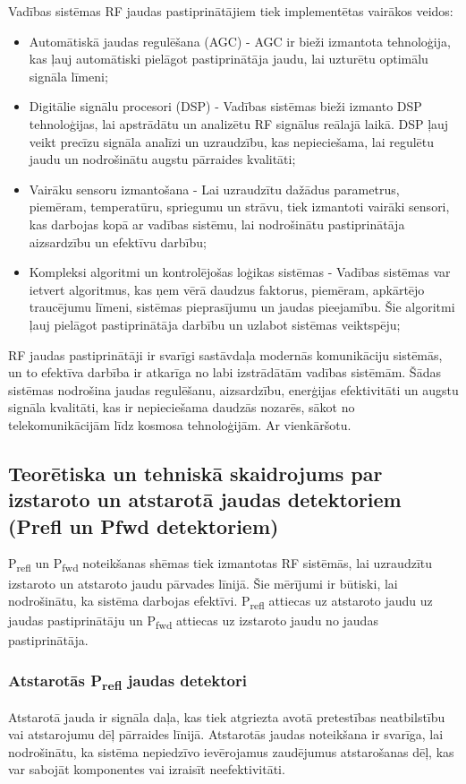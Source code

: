 Vadības sistēmas RF jaudas pastiprinātājiem tiek implementētas vairākos veidos:
\begin{itemize}
    \item Automātiskā jaudas regulēšana (AGC) - AGC ir bieži izmantota tehnoloģija, kas ļauj automātiski pielāgot pastiprinātāja jaudu, lai uzturētu optimālu signāla līmeni;
    \item Digitālie signālu procesori (DSP) - Vadības sistēmas bieži izmanto DSP tehnoloģijas, lai apstrādātu un analizētu RF signālus reālajā laikā. DSP ļauj veikt precīzu signāla analīzi un uzraudzību, kas nepieciešama, lai regulētu jaudu un nodrošinātu augstu pārraides kvalitāti;
    \item Vairāku sensoru izmantošana - Lai uzraudzītu dažādus parametrus, piemēram, temperatūru, spriegumu un strāvu, tiek izmantoti vairāki sensori, kas darbojas kopā ar vadības sistēmu, lai nodrošinātu pastiprinātāja aizsardzību un efektīvu darbību;
    \item Kompleksi algoritmi un kontrolējošas loģikas sistēmas - Vadības sistēmas var ietvert algoritmus, kas ņem vērā daudzus faktorus, piemēram, apkārtējo traucējumu līmeni, sistēmas pieprasījumu un jaudas pieejamību. Šie algoritmi ļauj pielāgot pastiprinātāja darbību un uzlabot sistēmas veiktspēju;
\end{itemize}

RF jaudas pastiprinātāji ir svarīgi sastāvdaļa modernās komunikāciju sistēmās, un to efektīva darbība ir atkarīga no labi izstrādātām vadības sistēmām. Šādas sistēmas nodrošina jaudas regulēšanu, aizsardzību, enerģijas efektivitāti un augstu signāla kvalitāti, kas ir nepieciešama daudzās nozarēs, sākot no telekomunikācijām līdz kosmosa tehnoloģijām. Ar vienkāršotu.

\subsection{Teorētiska un tehniskā skaidrojums par izstaroto un atstarotā jaudas detektoriem (Prefl un Pfwd detektoriem)}
P\textsubscript{refl} un P\textsubscript{fwd} noteikšanas shēmas tiek izmantotas RF sistēmās, lai uzraudzītu izstaroto un atstaroto jaudu pārvades līnijā. Šie mērījumi ir būtiski, lai nodrošinātu, ka sistēma darbojas efektīvi. P\textsubscript{refl} attiecas uz atstaroto jaudu uz jaudas pastiprinātāju un P\textsubscript{fwd} attiecas uz izstaroto jaudu no jaudas pastiprinātāja.

\subsubsection{Atstarotās P\textsubscript{refl} jaudas detektori}
Atstarotā jauda ir signāla daļa, kas tiek atgriezta avotā pretestības neatbilstību vai atstarojumu dēļ pārraides līnijā. Atstarotās jaudas noteikšana ir svarīga, lai nodrošinātu, ka sistēma nepiedzīvo ievērojamus zaudējumus atstarošanas dēļ, kas var sabojāt komponentes vai izraisīt neefektivitāti.

